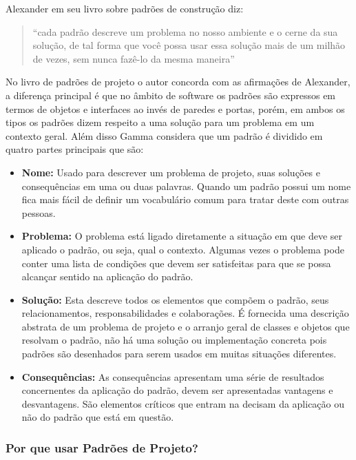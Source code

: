 Alexander em seu livro \cite{Alexander:1979} sobre padrões de construção diz:

\begin{quote}
	``cada padrão descreve um problema no nosso
ambiente e o cerne da sua solução, de tal forma que você possa usar essa solução mais
de um milhão de vezes, sem nunca fazê-lo da mesma maneira''
\end{quote}

No livro de padrões de projeto \cite{Gamma:Helm:Johnson:Vlissides:1995} o autor concorda com as afirmações de Alexander, a diferença principal é que no âmbito de software os padrões são expressos em termos de objetos e interfaces ao invés de paredes e portas, porém, em ambos os tipos os padrões dizem respeito a uma solução para um problema em um contexto geral. Além disso Gamma considera que um padrão é dividido em quatro partes principais que são:

\begin{itemize}
	\item \textbf{Nome:} Usado para descrever um problema de projeto, suas soluções e consequências em uma ou duas palavras. Quando um padrão possui um nome fica mais fácil de definir um vocabulário comum para tratar deste com outras pessoas.
	\item \textbf{Problema:} O problema está ligado diretamente a situação em que deve ser aplicado o padrão, ou seja, qual o contexto. Algumas vezes o problema pode conter uma lista de condições que devem ser satisfeitas para que se possa alcançar sentido na aplicação do padrão.
	\item \textbf{Solução:} Esta descreve todos os elementos que compõem o padrão, seus relacionamentos, responsabilidades e colaborações. É fornecida uma descrição abstrata de um problema de projeto e o arranjo geral de classes e objetos que resolvam o padrão, não há uma solução ou implementação concreta pois padrões são desenhados para serem usados em muitas situações diferentes.
	\item \textbf{Consequências:} As consequências apresentam uma série de resultados concernentes da aplicação do padrão, devem ser apresentadas vantagens e desvantagens. São elementos críticos que entram na decisam da aplicação ou não do padrão que está em questão.
\end{itemize}

\subsubsection{Por que usar Padrões de Projeto?}

